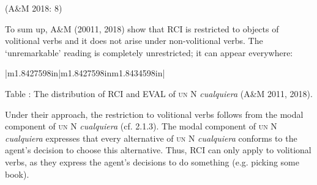 \begin{styleStandard}
(A\&M 2018: 8)
\end{styleStandard}

\begin{styleStandard}
To sum up, A\&M (20011, 2018) show that RCI is restricted to objects of volitional verbs and it does not arise under non-volitional verbs. The ‘unremarkable’ reading is completely unrestricted; it can appear everywhere:
\end{styleStandard}

\begin{center}
\tabletail{}
\tablelasttail{}
\begin{supertabular}{|m{1.8427598in}|m{1.8427598in}m{1.8434598in}|}

\end{supertabular}
\end{center}
\begin{styletablecaption}
Table : The distribution of RCI and EVAL of \textsc{un}\textit{ }N \textit{cualquiera} (A\&M 2011, 2018).
\end{styletablecaption}

\begin{styleStandard}
Under their approach, the restriction to volitional verbs follows from the modal component of \textsc{un} N \textit{cualquiera }(cf. 2.1.3). The modal component of \textsc{un} N \textit{cualquiera} expresses that every alternative of \textsc{un} N \textit{cualquiera} conforms to the agent’s decision to choose this alternative. Thus, RCI can only apply to volitional verbs, as they express the agent’s decisions to do something (e.g. picking some book).
\end{styleStandard}

